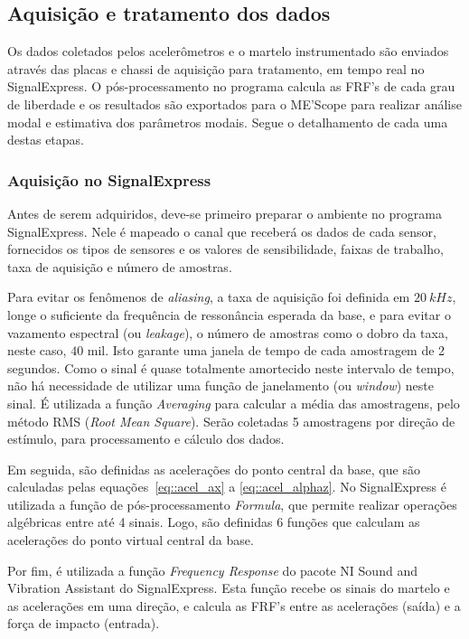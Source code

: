 


\subsection{Aquisição e tratamento dos dados}

Os dados coletados pelos acelerômetros e o martelo instrumentado são enviados
através das placas e chassi de aquisição para tratamento, em tempo real no
SignalExpress. O pós-processamento no programa calcula as FRF's de cada grau de
liberdade e os resultados são exportados para o ME'Scope para realizar análise
modal e estimativa dos parâmetros modais. Segue o detalhamento de cada uma
destas etapas.

\subsubsection{Aquisição no SignalExpress}

Antes de serem adquiridos, deve-se primeiro preparar o ambiente no
programa SignalExpress. Nele é mapeado o canal que receberá os dados
de cada sensor, fornecidos os tipos de sensores e os valores de sensibilidade,
faixas de trabalho, taxa de aquisição e número de amostras.

Para evitar os fenômenos de \textit{aliasing}, a taxa de aquisição foi definida
em $20~kHz$, longe o suficiente da frequência de
ressonância esperada da base, e para evitar o vazamento espectral (ou
\textit{leakage}), o número de amostras como o dobro da taxa, neste caso, $40$
mil. Isto garante uma janela de tempo de cada amostragem de 2 segundos. Como o
sinal é quase totalmente amortecido neste intervalo de tempo, não há necessidade
de utilizar uma função de janelamento (ou \textit{window}) neste sinal.
É utilizada a função \textit{Averaging} para calcular a média das amostragens,
pelo método RMS (\textit{Root Mean Square}).
Serão coletadas 5 amostragens por direção de estímulo, para processamento e
cálculo dos dados.

Em seguida, são definidas as acelerações do ponto central da base, que são
calculadas pelas equações~\ref{eq::acel_ax} a \ref{eq::acel_alphaz}. No
SignalExpress é utilizada a função de pós-processamento \textit{Formula}, que
permite realizar operações algébricas entre até 4 sinais. Logo, são definidas 6
funções que calculam as acelerações do ponto virtual central da base.

Por fim, é utilizada a função \textit{Frequency Response} do pacote NI Sound and
Vibration Assistant do SignalExpress. Esta função recebe  os sinais do
martelo e as acelerações em uma direção, e calcula as FRF's
entre as acelerações (saída) e a força de impacto (entrada).


